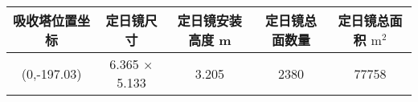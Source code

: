 \begin{tabular}{|c|c|c|c|c|}
\hline
吸收塔位置坐标 & 定日镜尺寸 & 定日镜安装高度 m & 定日镜总面数量 & 定日镜总面积 \(\mathrm{m}^{2}\)\\
\hline
(0,-197.03) & 6.365 \(\times\) 5.133 & 3.205 & 2380 & 77758\\
\hline
\end{tabular}
